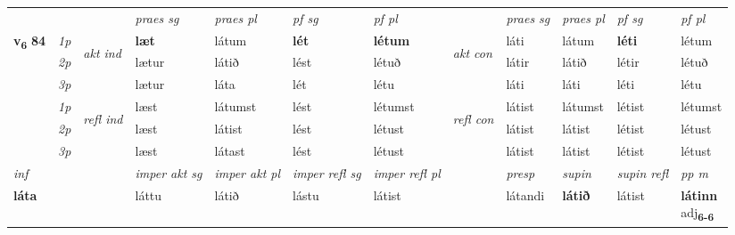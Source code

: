 \begin{longtable}[l]{X>{\footnotesize\itshape}llXXXXlXXXX}
 & &   & \textit{praes sg}  & \textit{praes pl}    & \textit{ pf sg} & \textit{pf pl} & & \textit{praes sg}  & \textit{praes pl}    & \textit{pf sg} & \textit{pf pl }  \\ \cmidrule{4-7} \cmidrule{9-12}
 \multirow{2}{*}{{{\textbf{v{\textsubscript{6}}} \Large{\textbf{84}}}}}  & 1p & \multirow{3}{*}{\begin{turn}{90}\textit{akt ind}\end{turn}} & \textbf{læt} & látum & \textbf{lét} & \textbf{létum} & \multirow{3}{*}{\begin{turn}{90}\textit{akt con}\end{turn}} &láti & látum & \textbf{léti} & létum\\*
 & 2p &  &  lætur  & látið & lést & létuð & & látir & látið & létir & létuð \\*
 & 3p &  & lætur & láta & lét & létu & & láti & láti& léti & létu \\*
\cmidrule{4-7} \cmidrule{9-12}
 & 1p & \multirow{3}{*}{\begin{turn}{90}\textit{refl ind}\end{turn}}  & læst & látumst & lést & létumst & \multirow{3}{*}{\begin{turn}{90}\textit{refl con}\end{turn}}  &látist & látumst & létist & létumst \\*
 & 2p &  & læst & látist & lést & létust & &látist & látist & létist & létust \\*
 & 3p  & & læst & látast & lést & létust & & látist & látist& létist & létust \\*
\cmidrule{4-7} \cmidrule{9-12}

   {\textit{inf}} & &  & \textit{imper akt sg} & \textit{imper akt pl} & \textit{imper refl sg} & \textit{imper refl pl} && \textit{presp} & \textit{supin} & \textit{supin refl} & \textit{pp m} \\*
  {\textbf{láta}} & && láttu  & látið & lástu & látist && látandi &  \textbf{látið} & látist & \specialcell{\textbf{látinn} \\ adj\textbf{\textsubscript{6-6}}} \\*

\midrule


\end{longtable}
